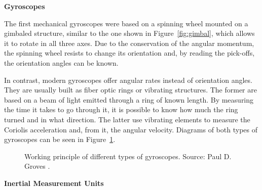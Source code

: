 \begin{description}
	\item \textbf{Gyroscopes}
	
	The first mechanical gyroscopes were based on a spinning wheel mounted on a gimbaled structure, similar to the one shown in Figure~\ref{fig:gimbal}, which allows it to rotate in all three axes.
	Due to the conservation of the angular momentum, the spinning wheel resists to change its orientation and, by reading the pick-offs, the orientation angles can be known.
	
	In contrast, modern gyroscopes offer angular rates instead of orientation angles. 
	They are usually built as fiber optic rings or vibrating structures.
	The former are based on a beam of light emitted through a ring of known length. By measuring the time it takes to go through it, it is possible to know how much the ring turned and in what direction.
	The latter use vibrating elements to measure the Coriolis acceleration and, from it, the angular velocity.
	Diagrams of both types of gyroscopes can be seen in Figure~\ref{fig:MEMS_gyro_types}.	
		\begin{figure}[!t]
			\centering
			\vfil
			\caption[Working principle of different types of gyroscopes]{Working principle of different types of gyroscopes. Source: Paul D. Groves \cite{groves_navigation_2015}.}
			\label{fig:MEMS_gyro_types}
		\end{figure}	
	\item \textbf{Inertial Measurement Units}
	

\end{description}
